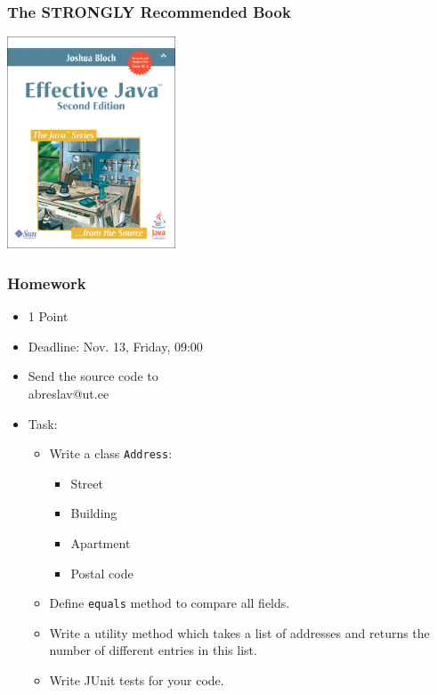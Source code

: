 \documentclass[screen]{beamer}
\begin{document}
\begin{frame}[fragile]
\frametitle{The STRONGLY Recommended Book}
\begin{center}
\includegraphics[width=5cm,height=6.3cm]{EJCover.png}
\end{center}
\end{frame}

\begin{frame}[fragile]
\frametitle{Homework}

\begin{itemize}[<+->]
	\item 1 Point
	\item Deadline: Nov. 13, Friday, 09:00
	\item Send the source code to\\
		abreslav@ut.ee
	\item Task:\\
		\begin{itemize}
		\item Write a class \texttt{Address}:
		\begin{itemize}
			\item Street
			\item Building
			\item Apartment
			\item Postal code
		\end{itemize}
		\item Define \texttt{equals} method to compare all fields.\\
		\item Write a utility method which takes a list of addresses and returns the number of different entries in this list.\\
		\item Write JUnit tests for your code.
		\end{itemize}
\end{itemize}

\end{frame}
\end{document}
